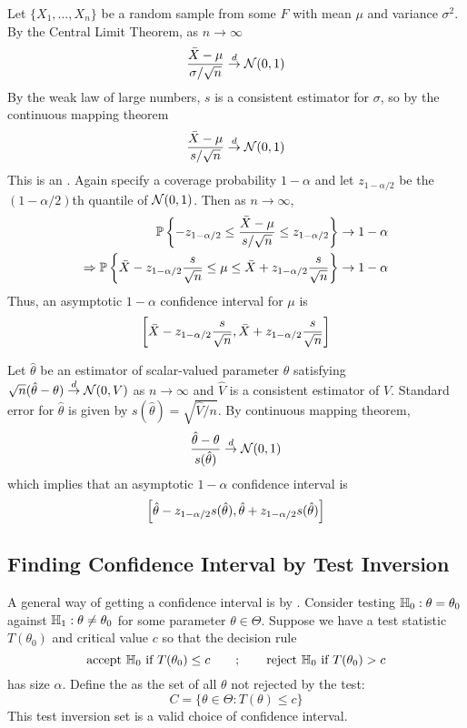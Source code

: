 \documentclass[10pt]{article}
\begin{document}
\begin{example}
	Let $\{X_1,\dots,X_n\}$ be a random sample from some $F$ with mean $\mu$ and variance $\sigma^2$. By the Central Limit Theorem, as $n \to \infty$
	\[
	\frac{\bar{X}-\mu}{\sigma / \sqrt{n}} \overset{d}{\to} \mathcal{N}(0,1)
	\]
	By the weak law of large numbers, $s$ is a consistent estimator for $\sigma$, so by the continuous mapping theorem
	\[
	\frac{\bar{X}-\mu}{s / \sqrt{n}} \overset{d}{\to} \mathcal{N}(0,1)
	\]
	This is an . Again specify a coverage probability $1-\alpha$ and let $z_{1-\alpha/ 2}$ be the $(1-\alpha / 2)$th quantile of $\mathcal{N}(0,1)$. Then as $n \to \infty$,
	\begin{align*}
		\mathbb{P} \left\{ -z_{1-\alpha/ 2} \le \frac{\bar{X} - \mu}{s / \sqrt{n}} \le z_{1-\alpha/ 2}\right\} &\to 1-\alpha \\
		\Rightarrow \mathbb{P} \left\{ \bar{X} - z_{1-\alpha / 2} \frac{s}{\sqrt{n}} \le \mu \le \bar{X} + z_{1-\alpha / 2} \frac{s}{\sqrt{n}}\right\} &\to 1-\alpha
	\end{align*}
	Thus, an asymptotic $1-\alpha$ confidence interval for $\mu$ is
	\[
	\left[ \bar{X} - z_{1-\alpha / 2} \frac{s}{\sqrt{n}}, \bar{X} + z_{1-\alpha / 2} \frac{s}{\sqrt{n}}\right]
	\]
\end{example}

\begin{example}
	Let $\hat{\theta}$ be an estimator of scalar-valued parameter $\theta$ satisfying $\sqrt{n}(\hat{\theta} - \theta) \overset{d}{\to} \mathcal{N}(0,V)$ as $n \to \infty$ and $\hat{V}$ is a consistent estimator of $V$. Standard error for $\hat{\theta}$ is given by $s(\hat{\theta}) = \sqrt{\hat{V} / n}$. By continuous mapping theorem,
	\[
	\frac{\hat{\theta} - \theta}{s(\hat{\theta})} \overset{d}{\to} \mathcal{N}(0,1)
	\]
	which implies that an asymptotic $1-\alpha$ confidence interval is
	\[
	\left[ \hat{\theta} - z_{1-\alpha / 2} s(\hat{\theta}),\hat{\theta} + z_{1-\alpha / 2} s(\hat{\theta})\right]
	\]
\end{example}

\subsection{Finding Confidence Interval by Test Inversion}

\begin{definition}
	A general way of getting a confidence interval is by . Consider testing $\mathbb{H}_0 : \theta = \theta_0$ against $\mathbb{H}_1: \theta \ne \theta_0$ for some parameter $\theta \in \Theta$. Suppose we have a test statistic $T(\theta_0)$ and critical value $c$ so that the decision rule
	\[
	\text{accept } \mathbb{H}_0 \text{ if } T(\theta_0) \le c \qquad ; \qquad \text{reject } \mathbb{H}_0 \text{ if } T(\theta_0) > c 
	\]
	has size $\alpha$. Define the  as the set of all $\theta$ not rejected by the test:
	\[
	C = \{\theta \in \Theta : T(\theta) \le c\}
	\]
	This test inversion set is a valid choice of confidence interval.
\end{definition}
\end{document}
